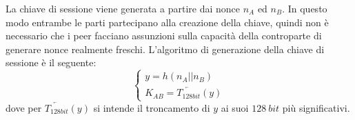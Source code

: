 	La chiave di sessione viene generata a partire dai nonce $n_A$ ed $n_B$. In questo modo entrambe le parti partecipano
	alla creazione della chiave, quindi non è necessario che i peer facciano assunzioni sulla capacità
	della controparte di generare nonce realmente freschi.
	L'algoritmo di generazione della chiave di sessione è il seguente:
	\[
		\begin{cases}
			y = h ( n_A || n_B )\\
			K_{AB} =  \overleftarrow{T_{128bit}}(y)
		\end{cases}
	\]
	dove per $\overleftarrow{T_{128bit}}(y)$ si intende il troncamento di $y$ ai suoi $128\ bit$ più significativi.
\clearpage{\pagestyle{empty}\cleardoublepage}
